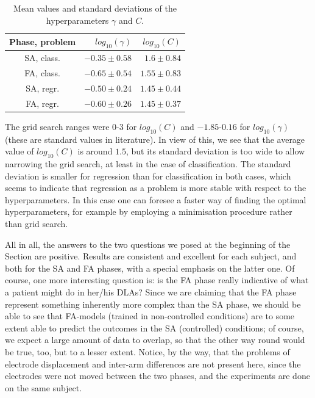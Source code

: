 \begin{table}[!ht] \centering
  \caption{Mean values and standard deviations of the hyperparameters $\gamma$ and $C$.}
  \begin{tabular}{|c|r|r|}
    \hline
    Phase, problem & $log_{10}(\gamma)$ & $log_{10}(C)$ \\
    \hline
    SA, class.     & $-0.35 \pm 0.58$   & $1.6  \pm 0.84$ \\
    FA, class.     & $-0.65 \pm 0.54$   & $1.55 \pm 0.83$ \\
    SA, regr.      & $-0.50 \pm 0.24$   & $1.45 \pm 0.44$ \\
    FA, regr.      & $-0.60 \pm 0.26$   & $1.45 \pm 0.37$ \\
    \hline
  \end{tabular}
  \label{tab:hyp}
\end{table}

The grid search ranges were $0$-$3$ for $log_{10}(C)$ and
$-1.85$-$0.16$ for $log_{10}(\gamma)$ (these are standard values in
literature). In view of this, we see that the average value of
$log_{10}(C)$ is around $1.5$, but its standard deviation is too wide
to allow narrowing the grid search, at least in the case of
classification. The standard deviation is smaller for regression than
for classification in both cases, which seems to indicate that
regression as a problem is more stable with respect to the
hyperparameters. In this case one can foresee a faster way of finding
the optimal hyperparameters, for example by employing a minimisation
procedure rather than grid search.

All in all, the answers to the two questions we posed at the beginning
of the Section are positive. Results are consistent and excellent for
each subject, and both for the SA and FA phases, with a special
emphasis on the latter one. Of course, one more interesting question
is: is the FA phase really indicative of what a patient might do in
her/his DLAs? Since we are claiming that the FA phase represent
something inherently more complex than the SA phase, we should be able
to see that FA-models (trained in non-controlled conditions) are to
some extent able to predict the outcomes in the SA (controlled)
conditions; of course, we expect a large amount of data to overlap, so
that the other way round would be true, too, but to a lesser
extent. Notice, by the way, that the problems of electrode
displacement and inter-arm differences are not present here, since the
electrodes were not moved between the two phases, and the experiments
are done on the same subject.

